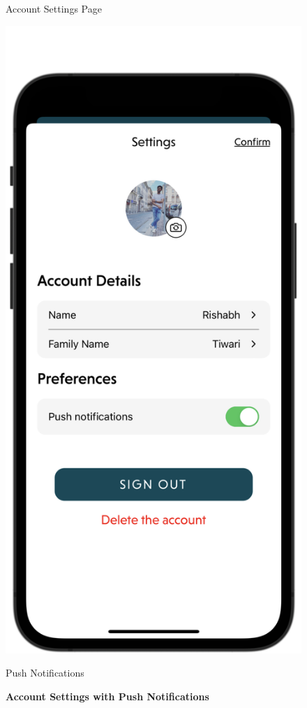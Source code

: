 \begin{figure}[H]
\begin{minipage}[b]{0.43\linewidth}
        \caption{Account Settings Page}
    \end{minipage}
    \hspace{0.1\linewidth}
    \begin{minipage}[b]{0.43\linewidth}
        \centering
        \includegraphics[width=\linewidth]{Mobile UI/Push Notifications.png}
        \caption{Push Notifications}
    \end{minipage}
    \vspace{0.5cm}
    \caption{\textbf{Account Settings with Push Notifications}}
\end{figure}



